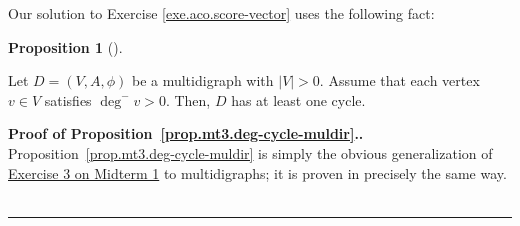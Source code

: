 \documentclass[numbers=enddot,12pt,final,onecolumn,notitlepage]{scrartcl}%
\theoremstyle{definition}
\newtheorem{prop}[theo]{Proposition}
\newenvironment{proposition}[1][]
{\begin{prop}[#1]\begin{leftbar}}
{\end{leftbar}\end{prop}}
\newenvironment{proof}[1][Proof]{\noindent\textbf{#1.} }{\ \rule{0.5em}{0.5em}}
\newcommand{\abs}[1]{\left| #1 \right|}
\newcommand{\tup}[1]{\left( #1 \right)}
\begin{document}
Our solution to Exercise \ref{exe.aco.score-vector} uses the
following fact:

\begin{proposition} \label{prop.mt3.deg-cycle-muldir}
Let $D = \tup{V, A, \phi}$ be a multidigraph with $\abs{V} > 0$.
Assume that each vertex $v \in V$ satisfies $\deg^- v > 0$. 
Then, $D$ has at least one cycle.
\end{proposition}

\begin{proof}[Proof of Proposition~\ref{prop.mt3.deg-cycle-muldir}.]
Proposition~\ref{prop.mt3.deg-cycle-muldir} is simply the
obvious generalization of
\href{http://www.cip.ifi.lmu.de/~grinberg/t/17s/mt1s.pdf}{Exercise 3 on
Midterm 1} to multidigraphs;
it is proven in precisely the same way.
\end{proof}
\end{document}
